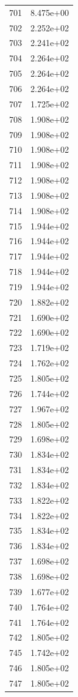 \documentclass[12pt]{article}
\begin{document}
\begin{longtable}{@{}cc@{}}
701 & 8.475e+00 \\
702 & 2.252e+02 \\
703 & 2.241e+02 \\
704 & 2.264e+02 \\
705 & 2.264e+02 \\
706 & 2.264e+02 \\
707 & 1.725e+02 \\
708 & 1.908e+02 \\
709 & 1.908e+02 \\
710 & 1.908e+02 \\
711 & 1.908e+02 \\
712 & 1.908e+02 \\
713 & 1.908e+02 \\
714 & 1.908e+02 \\
715 & 1.944e+02 \\
716 & 1.944e+02 \\
717 & 1.944e+02 \\
718 & 1.944e+02 \\
719 & 1.944e+02 \\
720 & 1.882e+02 \\
721 & 1.690e+02 \\
722 & 1.690e+02 \\
723 & 1.719e+02 \\
724 & 1.762e+02 \\
725 & 1.805e+02 \\
726 & 1.744e+02 \\
727 & 1.967e+02 \\
728 & 1.805e+02 \\
729 & 1.698e+02 \\
730 & 1.834e+02 \\
731 & 1.834e+02 \\
732 & 1.834e+02 \\
733 & 1.822e+02 \\
734 & 1.822e+02 \\
735 & 1.834e+02 \\
736 & 1.834e+02 \\
737 & 1.698e+02 \\
738 & 1.698e+02 \\
739 & 1.677e+02 \\
740 & 1.764e+02 \\
741 & 1.764e+02 \\
742 & 1.805e+02 \\
745 & 1.742e+02 \\
746 & 1.805e+02 \\
747 & 1.805e+02 \\

\end{longtable}
\end{document}
